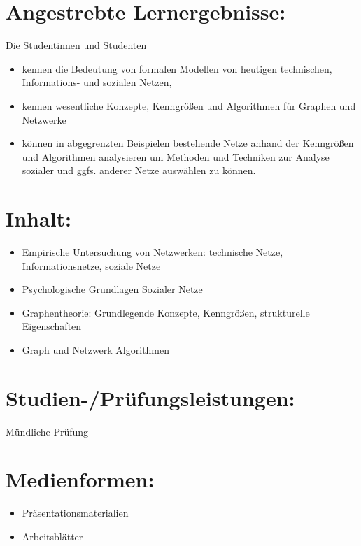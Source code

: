 \section*{Angestrebte
Lernergebnisse:}\label{angestrebte-lernergebnisse-11}

Die Studentinnen und Studenten

\begin{itemize}
\item
  kennen die Bedeutung von formalen Modellen von heutigen technischen,
  Informations- und sozialen Netzen,
\item
  kennen wesentliche Konzepte, Kenngrößen und Algorithmen für Graphen
  und Netzwerke
\item
  können in abgegrenzten Beispielen bestehende Netze anhand der
  Kenngrößen und Algorithmen analysieren um Methoden und Techniken zur
  Analyse sozialer und ggfs. anderer Netze auswählen zu können.
\end{itemize}

\section*{Inhalt:}\label{inhalt-11}

\begin{itemize}
\item
  Empirische Untersuchung von Netzwerken: technische Netze,
  Informationsnetze, soziale Netze
\item
  Psychologische Grundlagen Sozialer Netze
\item
  Graphentheorie: Grundlegende Konzepte, Kenngrößen, strukturelle
  Eigenschaften
\item
  Graph und Netzwerk Algorithmen
\end{itemize}

\section*{Studien-/Prüfungsleistungen:}\label{studien-pruxfcfungsleistungen-11}

Mündliche Prüfung

\section*{Medienformen:}\label{medienformen-11}

\begin{itemize}
\item
  Präsentationsmaterialien
\item
  Arbeitsblätter
\end{itemize}

